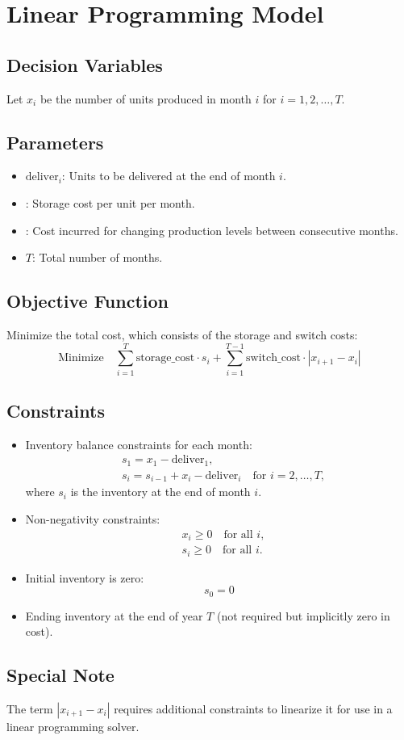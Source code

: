 \documentclass{article}
\begin{document}
\section*{Linear Programming Model}

\subsection*{Decision Variables}
Let \( x_i \) be the number of units produced in month \( i \) for \( i = 1, 2, \ldots, T \).

\subsection*{Parameters}
\begin{itemize}
    \item \( \text{deliver}_i \): Units to be delivered at the end of month \( i \).
    \item {}: Storage cost per unit per month.
    \item {}: Cost incurred for changing production levels between consecutive months.
    \item \( T \): Total number of months.
\end{itemize}

\subsection*{Objective Function}
Minimize the total cost, which consists of the storage and switch costs:
\[
\text{Minimize} \quad \sum_{i=1}^{T} \text{storage\_cost} \cdot s_i + \sum_{i=1}^{T-1} \text{switch\_cost} \cdot |x_{i+1} - x_i|
\]

\subsection*{Constraints}
\begin{itemize}
    \item Inventory balance constraints for each month:
    \[
    \begin{aligned}
        & s_1 = x_1 - \text{deliver}_1, \\
        & s_i = s_{i-1} + x_i - \text{deliver}_i \quad \text{for } i = 2, \ldots, T,
    \end{aligned}
    \]
    where \( s_i \) is the inventory at the end of month \( i \).

    \item Non-negativity constraints:
    \[
    \begin{aligned}
        & x_i \geq 0 \quad \text{for all } i, \\
        & s_i \geq 0 \quad \text{for all } i.
    \end{aligned}
    \]

    \item Initial inventory is zero:
    \[
    s_0 = 0
    \]

    \item Ending inventory at the end of year \( T \) (not required but implicitly zero in cost).
\end{itemize}

\subsection*{Special Note}
The term \( |x_{i+1} - x_i| \) requires additional constraints to linearize it for use in a linear programming solver.
\end{document}
